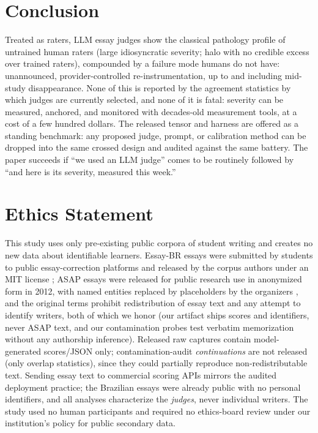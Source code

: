 \documentclass[fleqn,10pt]{JLA_article}
\begin{document}
\section{Conclusion}
Treated as raters, LLM essay judges show the classical pathology profile of untrained human raters (large idiosyncratic severity; halo with no credible excess over trained raters), compounded by a
failure mode humans do not have: unannounced, provider-controlled re-instrumentation, up to and
including mid-study disappearance. None of this is reported by the agreement statistics by which judges are currently selected, and none of it is fatal: severity can be measured, anchored, and monitored with decades-old measurement tools, at a cost of a few hundred dollars. The released tensor and harness are offered as a standing benchmark: any proposed judge,
prompt, or calibration method can be dropped into the same crossed design and audited against the
same battery. The paper succeeds if ``we used an LLM judge'' comes to be routinely followed by ``and here is its severity, measured this week.''

\section*{Ethics Statement}
This study uses only pre-existing public corpora of student writing and creates no new data about identifiable learners. Essay-BR essays were submitted by students to public essay-correction platforms and released by the corpus authors under an MIT license \cite{marinho2021}; ASAP essays were released for public research use in anonymized form in 2012, with named entities replaced by placeholders by the organizers \cite{hewlett2012}, and the original terms prohibit redistribution of essay text and any attempt to identify writers, both of which we honor (our artifact ships scores and identifiers, never ASAP text, and our contamination probes test verbatim memorization without any authorship inference). Released raw captures contain model-generated scores/JSON only; contamination-audit \emph{continuations} are not released (only overlap statistics), since they could partially reproduce non-redistributable text. Sending essay text to commercial scoring APIs mirrors the audited deployment practice; the Brazilian essays were already public with no personal identifiers, and all analyses characterize the \emph{judges}, never individual writers. The study used no human participants and required no ethics-board review under our institution's policy for public secondary data.
\end{document}
